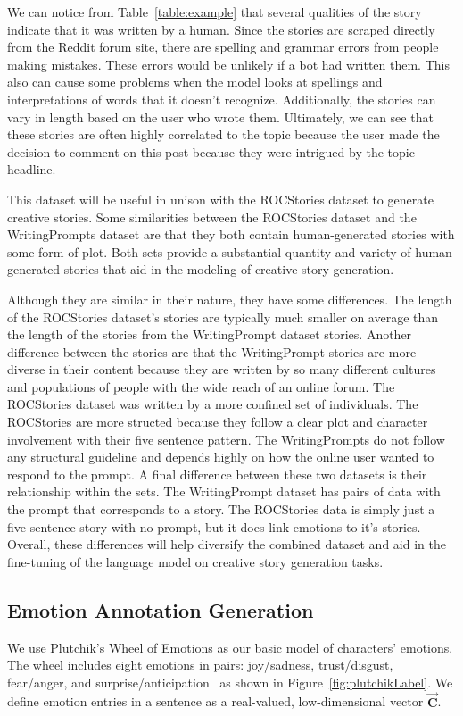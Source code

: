 \documentclass[letterpaper]{article}
\begin{document}
We can notice from Table~\ref{table:example} that several qualities of the story indicate that it was written by a human. Since the stories are scraped directly from the Reddit forum site, there are spelling and grammar errors from people making mistakes. These errors would be unlikely if a bot had written them. This also can cause some problems when the model looks at spellings and interpretations of words that it doesn't recognize. Additionally, the stories can vary in length based on the user who wrote them. Ultimately, we can see that these stories are often highly correlated to the topic because the user made the decision to comment on this post because they were intrigued by the topic headline.

This dataset will be useful in unison with the ROCStories dataset to generate creative stories. Some similarities between the ROCStories dataset and the WritingPrompts dataset are that they both contain human-generated stories with some form of plot. Both sets provide a substantial quantity and variety of human-generated stories that aid in the modeling of creative story generation. 

Although they are similar in their nature, they have some differences. The length of the ROCStories dataset's stories are typically much smaller on average than the length of the stories from the WritingPrompt dataset stories. Another difference between the stories are that the WritingPrompt stories are more diverse in their content because they are written by so many different cultures and populations of people with the wide reach of an online forum. The ROCStories dataset was written by a more confined set of individuals. The ROCStories are more structed because they follow a clear plot and character involvement with their five sentence pattern. The WritingPrompts do not follow any structural guideline and depends highly on how the online user wanted to respond to the prompt. A final difference between these two datasets is their relationship within the sets. The WritingPrompt dataset has pairs of data with the prompt that corresponds to a story. The ROCStories data is simply just a five-sentence story with no prompt, but it does link emotions to it's stories. Overall, these differences will help diversify the combined dataset and aid in the fine-tuning of the language model on creative story generation tasks. 

\subsection{Emotion Annotation Generation}
We use Plutchik's Wheel of Emotions as our basic model of characters' emotions. The wheel includes eight emotions in pairs: joy/sadness, trust/disgust, fear/anger, and surprise/anticipation~\cite{plutchik1980general} as shown in Figure~\ref{fig:plutchikLabel}. We define emotion entries in a sentence as a real-valued, low-dimensional vector $\vec{\mathbf{C}}$.
\end{document}
